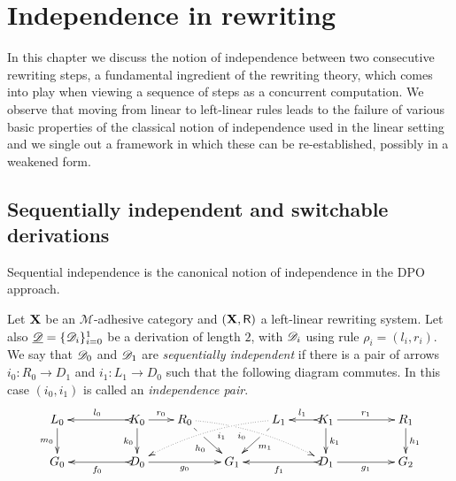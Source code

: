 
\chapter{Independence in rewriting}

In this chapter we discuss the notion of independence between two
consecutive rewriting steps, a fundamental ingredient of the rewriting
theory, which comes into play when viewing a sequence of steps as a
concurrent computation. We observe that moving from linear to
left-linear rules leads to the failure of various basic properties of
the classical notion of independence used in the linear setting and we
single out a framework in which these can be re-established, possibly
in a weakened form.

\section{Sequentially independent and switchable derivations }\label{subsec:switch}

Sequential independence is the canonical notion of independence in the DPO approach.

\begin{definition}
	\label{de:sequential-independence}
	Let $\textbf {\textup{X}}$ be an $\mathcal{M}$-adhesive category 
	and $(\textbf {\textup{X}}, \mathsf{R})$ a left-linear rewriting system. 
	Let also
	$\underline{\mathscr{D}}=\{\mathscr{D}_i\}_{i=0}^1$ be a derivation of length $2$, with
	$\mathscr{D}_i$ using rule $\rho_i = (l_i,r_i)$.  We say that $\mathscr{D}_0$ and
	$\mathscr{D}_1$ are
	\emph{sequentially independent}
	if there is a pair of arrows
	$i_0\colon R_0\to D_1$ and $i_1\colon L_1\to D_0$ such that the
	following diagram commutes. In this case $(i_0,i_1)$ is called an  \emph{independence
		pair}.
	\[\xymatrix@R=20pt@C=20pt{L_0 \ar[d]_{m_0}&& K_0
		\ar[d]_{k_0}\ar@{>->}[ll]_{l_0} \ar[r]^{r_0} & R_0
		\ar@{.>}@/^.25cm/[drrr]|(.32)\hole_(.4){i_0}
		\ar[dr]|(.33)\hole_{h_0} && L_1 \ar@{.>}@/_.25cm/[dlll]^(.4){i_1}
		\ar[dl]|(.33)\hole^{m_1}& K_1 \ar[d]^{k_1}\ar@{>->}[l]_{l_1}
		\ar[rr]^{r_1} && R_1 \ar[d]^{h_1}\\G_0 && \ar@{>->}[ll]^{f_0}
		D_0 \ar[rr]_{g_0}&& G_1 && \ar@{>->}[ll]^{f_1} D_1
		\ar[rr]_{g_1}&& G_2}
	\]
\end{definition}

